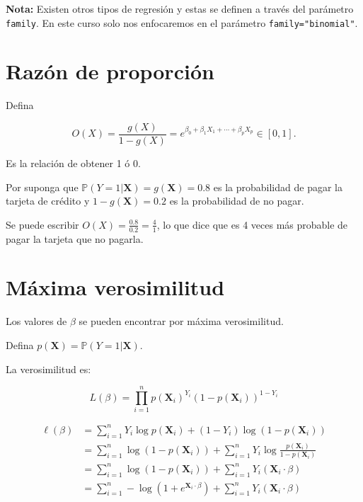 \documentclass[
  12pt,
]{book}
\theoremstyle{definition}
\theoremstyle{definition}
\theoremstyle{definition}
\theoremstyle{remark}
\begin{document}
\textbf{Nota:} Existen otros tipos de regresión y estas se definen a través del parámetro \texttt{family}. En este curso solo nos enfocaremos en el parámetro \texttt{family="binomial"}.

\hypertarget{razuxf3n-de-proporciuxf3n}{%
\section{Razón de proporción}\label{razuxf3n-de-proporciuxf3n}}

Defina

\begin{equation*}
O(X) = \frac{g(X)}{1-g(X)} = e^{\beta_{0} +\beta_{1} X_{1} + \cdots + \beta_{p} X_{p}} \in [0,1].
\end{equation*}

Es la relación de obtener 1 ó 0.

Por suponga que \(\mathbb{P}\left(Y=1\vert \boldsymbol{X}\right) = g(\boldsymbol{X}) = 0.8\) es la probabilidad de pagar la tarjeta de crédito y \(1-g(\boldsymbol{X}) = 0.2\) es la probabilidad de no pagar.

Se puede escribir \(O(X) = \frac{0.8}{0.2} = \frac{4}{1}\), lo que dice que es 4 veces más probable de pagar la tarjeta que no pagarla.

\hypertarget{muxe1xima-verosimilitud}{%
\section{Máxima verosimilitud}\label{muxe1xima-verosimilitud}}

Los valores de \(\beta\) se pueden encontrar por máxima verosimilitud.

Defina \(p(\boldsymbol{X}) = \mathbb{P}\left(Y=1\vert \boldsymbol{X}\right)\).

La verosimilitud es:

\[
L\left(\beta\right)=\prod_{i=1}^{n} p\left(\boldsymbol{X}_{i}\right)^{Y_{i}}\left(1-p\left(\boldsymbol{X}_{i}\right)\right)^{1-Y_{i}}
\]

\begin{align*}
\ell\left(\beta\right) 
&=\sum_{i=1}^{n} Y_{i} \log p\left(\boldsymbol{X}_{i}\right)+\left(1-Y_{i}\right) \log \left(1-p\left(\boldsymbol{X}_{i}\right)\right) \\
&=\sum_{i=1}^{n} \log \left(1-p\left(\boldsymbol{X}_{i}\right)\right)+\sum_{i=1}^{n} Y_{i} \log \frac{p\left(\boldsymbol{X}_{i}\right)}{1-p\left(\boldsymbol{X}_{i}\right)} \\
&=\sum_{i=1}^{n} \log \left(1-p\left(\boldsymbol{X}_{i}\right)\right)+\sum_{i=1}^{n} Y_{i}\left(\boldsymbol{X}_{i} \cdot \beta\right) \\
&=\sum_{i=1}^{n}-\log \left(1+e^{\boldsymbol{X}_{i} \cdot \beta}\right)+\sum_{i=1}^{n} Y_{i}\left(\boldsymbol{X}_{i} \cdot \beta\right)
\end{align*}
\end{document}
